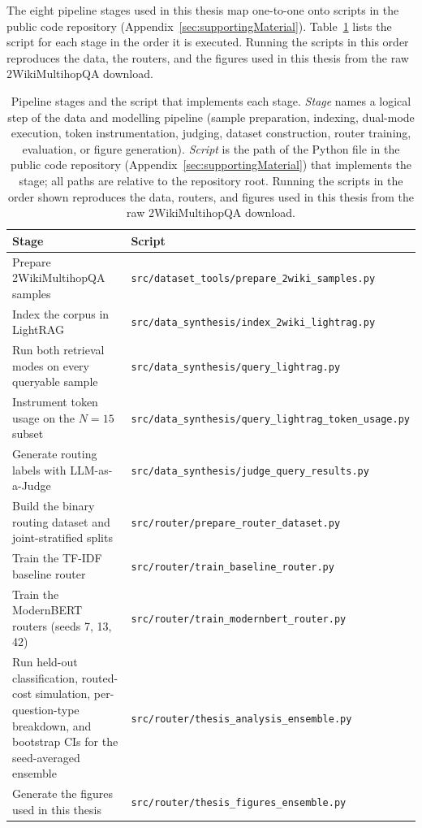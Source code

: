\documentclass[english, bibtex]{kththesis}               %
\numberwithin{listing}{chapter}
\begin{document}
The eight pipeline stages used in this thesis map one-to-one onto scripts in the public code repository (Appendix~\ref{sec:supportingMaterial}). Table~\ref{tab:pipelineScripts} lists the script for each stage in the order it is executed. Running the scripts in this order reproduces the data, the routers, and the figures used in this thesis from the raw 2WikiMultihopQA download.

\begin{table}[!ht]
\centering
\caption{Pipeline stages and the script that implements each stage. \emph{Stage} names a logical step of the data and modelling pipeline (sample preparation, indexing, dual-mode execution, token instrumentation, judging, dataset construction, router training, evaluation, or figure generation). \emph{Script} is the path of the Python file in the public code repository (Appendix~\ref{sec:supportingMaterial}) that implements the stage; all paths are relative to the repository root. Running the scripts in the order shown reproduces the data, routers, and figures used in this thesis from the raw 2WikiMultihopQA download.}
\label{tab:pipelineScripts}
\begin{tabularx}{\textwidth}{p{}|X}
\textbf{Stage} & \textbf{Script} \\
\hline
Prepare 2WikiMultihopQA samples & \texttt{src/dataset\_tools/prepare\_2wiki\_samples.py} \\
Index the corpus in LightRAG & \texttt{src/data\_synthesis/index\_2wiki\_lightrag.py} \\
Run both retrieval modes on every queryable sample & \texttt{src/data\_synthesis/query\_lightrag.py} \\
Instrument token usage on the \(N = 15\) subset & \texttt{src/data\_synthesis/query\_lightrag\_token\_usage.py} \\
Generate routing labels with LLM-as-a-Judge & \texttt{src/data\_synthesis/judge\_query\_results.py} \\
Build the binary routing dataset and joint-stratified splits & \texttt{src/router/prepare\_router\_dataset.py} \\
Train the TF-IDF baseline router & \texttt{src/router/train\_baseline\_router.py} \\
Train the ModernBERT routers (seeds 7, 13, 42) & \texttt{src/router/train\_modernbert\_router.py} \\
Run held-out classification, routed-cost simulation, per-question-type breakdown, and bootstrap CIs for the seed-averaged ensemble & \texttt{src/router/thesis\_analysis\_ensemble.py} \\
Generate the figures used in this thesis & \texttt{src/router/thesis\_figures\_ensemble.py} \\
\end{tabularx}
\end{table}
\end{document}
